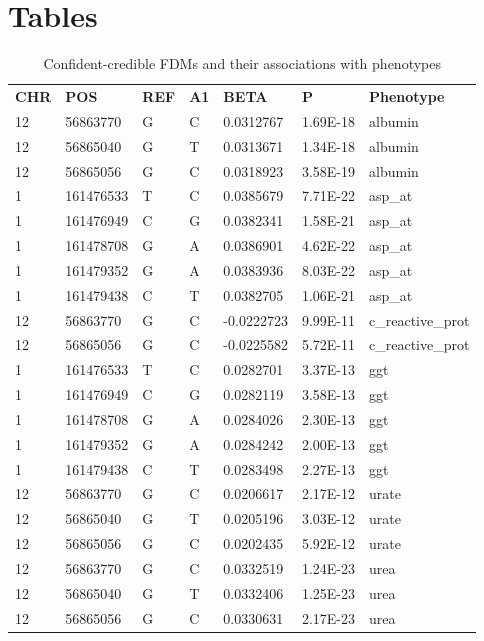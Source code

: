 \section{Tables}
\begin{table}[]
\begin{tabular}{lllllll}
\textbf{CHR} & \textbf{POS} & \textbf{REF} & \textbf{A1} & \textbf{BETA} & \textbf{P} & \textbf{Phenotype} \\
12 & 56863770  & G & C & 0.0312767  & 1.69E-18 & albumin           \\
12 & 56865040  & G & T & 0.0313671  & 1.34E-18 & albumin           \\
12 & 56865056  & G & C & 0.0318923  & 3.58E-19 & albumin           \\
1  & 161476533 & T & C & 0.0385679  & 7.71E-22 & asp\_at           \\
1  & 161476949 & C & G & 0.0382341  & 1.58E-21 & asp\_at           \\
1  & 161478708 & G & A & 0.0386901  & 4.62E-22 & asp\_at           \\
1  & 161479352 & G & A & 0.0383936  & 8.03E-22 & asp\_at           \\
1  & 161479438 & C & T & 0.0382705  & 1.06E-21 & asp\_at           \\
12 & 56863770  & G & C & -0.0222723 & 9.99E-11 & c\_reactive\_prot \\
12 & 56865056  & G & C & -0.0225582 & 5.72E-11 & c\_reactive\_prot \\
1  & 161476533 & T & C & 0.0282701  & 3.37E-13 & ggt               \\
1  & 161476949 & C & G & 0.0282119  & 3.58E-13 & ggt               \\
1  & 161478708 & G & A & 0.0284026  & 2.30E-13 & ggt               \\
1  & 161479352 & G & A & 0.0284242  & 2.00E-13 & ggt               \\
1  & 161479438 & C & T & 0.0283498  & 2.27E-13 & ggt               \\
12 & 56863770  & G & C & 0.0206617  & 2.17E-12 & urate             \\
12 & 56865040  & G & T & 0.0205196  & 3.03E-12 & urate             \\
12 & 56865056  & G & C & 0.0202435  & 5.92E-12 & urate             \\
12 & 56863770  & G & C & 0.0332519  & 1.24E-23 & urea              \\
12 & 56865040  & G & T & 0.0332406  & 1.25E-23 & urea              \\
12 & 56865056  & G & C & 0.0330631  & 2.17E-23 & urea             
\end{tabular}
\caption{Confident-credible FDMs and their associations with phenotypes}
\label{tab:4.1}
\end{table}

